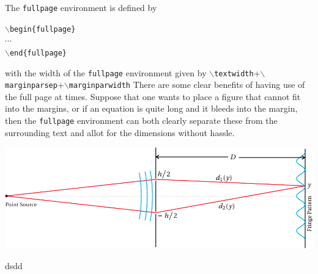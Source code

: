 \documentclass[]{subook}
\begin{document}
\begin{fullpage}
    The \texttt{fullpage} environment is defined by
    \begin{center}
        \texttt{$\backslash$begin\{fullpage\}}\\
        $\cdots$\\
        \texttt{$\backslash$end\{fullpage\}}
    \end{center}
    with the width of the \texttt{fullpage} environment given by \texttt{$\backslash$textwidth}+\texttt{$\backslash$marginparsep}+\texttt{$\backslash$marginparwidth}
    There are some clear benefits of having use of the full page at times. Suppose that one wants to place a figure that cannot fit into the margins, or if an equation is quite long and it bleeds into the margin, 
    then the \texttt{fullpage} environment can both clearly separate these from the surrounding text and allot for the dimensions without hassle. 

    \centering
        \includegraphics{img/f08Young.pdf}
        \label{fig:example} %
    \begin{definition}
        dsdd
    \end{definition}
\end{fullpage}
\end{document}
